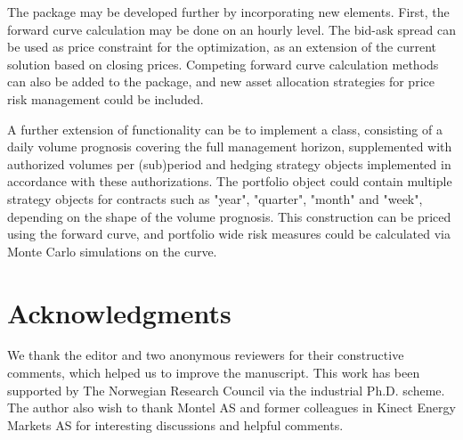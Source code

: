 The  package may be developed further by incorporating new elements. First, the forward curve calculation may be done on an hourly level. The bid-ask spread can be used as price constraint for the optimization, as an extension of the current solution based on closing prices. Competing forward curve calculation methods can also be added to the package, and new asset allocation strategies for price risk management could be included. 

A further extension of  functionality can be to implement a  class, consisting of a daily volume prognosis covering the full management horizon, supplemented with authorized volumes per (sub)period and hedging strategy objects implemented in accordance with these authorizations. The portfolio object could contain multiple strategy objects for contracts such as "year", "quarter", "month" and "week", depending on the shape of the volume prognosis. This construction can be priced using the forward curve, and portfolio wide risk measures could be calculated via Monte Carlo simulations on the curve.


\section{Acknowledgments}
We thank the editor and two anonymous reviewers for their constructive comments, which helped us to improve the manuscript. This work has been supported by The Norwegian Research Council via the industrial Ph.D. scheme. The author also wish to thank Montel AS and former colleagues in Kinect Energy Markets AS for interesting discussions and helpful comments.



\address{Anders D. Sleire\\
  Department of Mathematics\\
  University of Bergen\\
  P.O.Box 7803\\
  N-5020 Bergen\\
  Norway\\}
